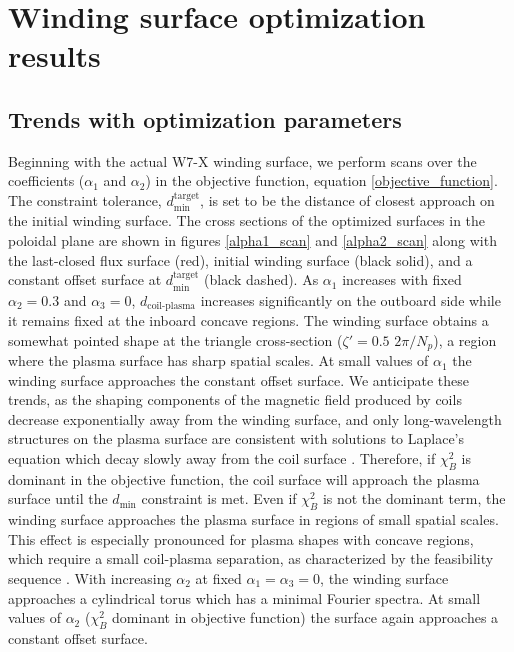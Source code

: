 \documentclass[aps,unsortedaddress]{revtex4-1}
\begin{document}
\section{Winding surface optimization results}
\label{sect_results}

\subsection{Trends with optimization parameters}
\FloatBarrier

Beginning with the actual W7-X winding surface, we perform scans over the coefficients ($\alpha_1$ and $\alpha_2$) in the objective function, equation \ref{objective_function}. The constraint tolerance, $d_{\text{min}}^{\text{target}}$, is set to be the distance of closest approach on the initial winding surface. The cross sections of the optimized surfaces in the poloidal plane are shown in figures \ref{alpha1_scan} and \ref{alpha2_scan} along with the last-closed flux surface (red), initial winding surface (black solid), and a constant offset surface at $d_{\text{min}}^{\text{target}}$ (black dashed). As $\alpha_1$ increases with fixed $\alpha_2 = 0.3$ and $\alpha_3 = 0$, $d_{\text{coil-plasma}}$ increases significantly on the outboard side while it remains fixed at the inboard concave regions. The winding surface obtains a somewhat pointed shape at the triangle cross-section ($\zeta' = 0.5$ $2\pi/N_p$), a region where the plasma surface has sharp spatial scales. At small values of $\alpha_1$ the winding surface approaches the constant offset surface. We anticipate these trends, as the shaping components of the magnetic field produced by coils decrease exponentially away from the winding surface, and only long-wavelength structures on the plasma surface are consistent with solutions to Laplace's equation which decay slowly away from the coil surface \cite{Boozer2000}. Therefore, if $\chi^2_B$ is dominant in the objective function, the coil surface will approach the plasma surface until the $d_{\text{min}}$ constraint is met. Even if $\chi^2_B$ is not the dominant term, the winding surface approaches the plasma surface in regions of small spatial scales. This effect is especially pronounced for plasma shapes with concave regions, which require a small coil-plasma separation, as characterized by the feasibility sequence \cite{Landreman2016}. With increasing $\alpha_2$ at fixed $\alpha_1 = \alpha_3 = 0$, the winding surface approaches a cylindrical torus which has a minimal Fourier spectra. At small values of $\alpha_2$ ($\chi^2_B$ dominant in objective function) the surface again approaches a constant offset surface. 
\end{document}
